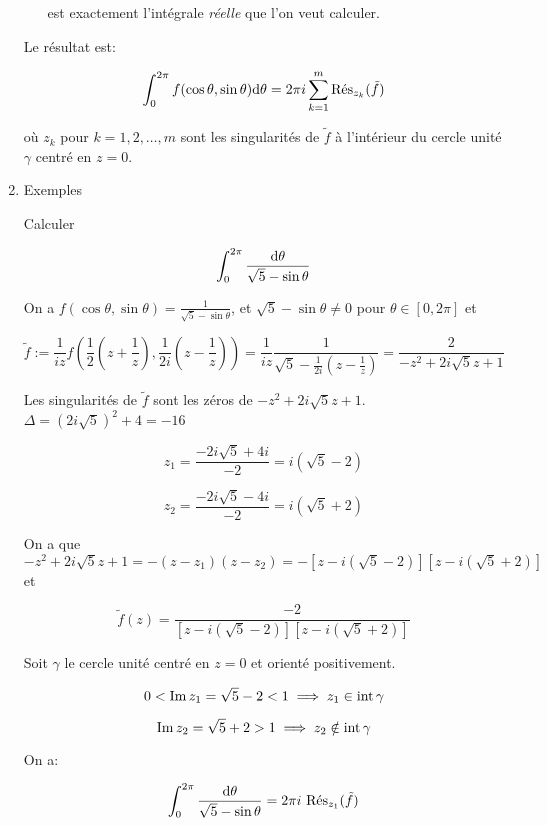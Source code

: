 \begin{enumerate}[label=\alph*)]
\begin{itemize}
    est exactement l'intégrale \textit{réelle} que l'on veut calculer.
    \end{itemize}

    Le résultat est:
    
    \[ \int_0^{2\pi} f(\cos \theta, \sin \theta) \dth = 2\pi i \sum_{k = 1}^m \Res_{z_k}(\tilde{f}) \]
    
    où $z_k$ pour $k = 1, 2, \ldots, m$ sont les singularités de $\tilde{f}$ à l'intérieur du cercle unité $\gamma$ centré en $z = 0$.
    
    \item Exemples
    
    \begin{example}[1]
        Calculer
        
        \[ \int_0^{2\pi} \frac{\dth}{\sqrt{5} - \sin \theta} \]
        
        On a $f(\cos \theta, \sin \theta) = \frac{1}{\sqrt{5} - \sin \theta}$, et $\sqrt{5} - \sin \theta \neq 0$ pour $\theta \in [0, 2\pi]$ et
        
        \[ \tilde{f} := \frac{1}{iz} f\left(\frac{1}{2} \left(z + \frac{1}{z}\right), \frac{1}{2i} \left(z - \frac{1}{z}\right)\right) = \frac{1}{iz} \frac{1}{\sqrt{5} - \frac{1}{2i} \left(z - \frac{1}{z}\right)} = \frac{2}{-z^2 + 2i\sqrt{5}z + 1} \]
        
        Les singularités de $\tilde{f}$ sont les zéros de $-z^2 + 2i\sqrt{5}z + 1$. $\Delta = (2i\sqrt{5})^2 + 4 = -16$
        
        \[ z_1 = \frac{-2i\sqrt{5} + 4i}{-2} = i(\sqrt{5} - 2) \]
        
        \[ z_2 = \frac{-2i\sqrt{5} - 4i}{-2} = i(\sqrt{5} + 2) \]
        
        On a que $-z^2 + 2i\sqrt{5}z + 1 = -(z - z_1)(z - z_2) = - \left[ z - i(\sqrt{5} - 2) \right] \left[ z - i(\sqrt{5} + 2) \right]$ et
        
        \[ \tilde{f}(z) = \frac{-2}{\left[ z - i(\sqrt{5} - 2) \right] \left[ z - i(\sqrt{5} + 2) \right]} \]
        
        Soit $\gamma$ le cercle unité centré en $z = 0$ et orienté positivement.
        
        \[ 0 < \Imp z_1 = \sqrt{5} - 2 < 1 \implies z_1 \in \inte \gamma  \]
        
        \[ \Imp z_2 = \sqrt{5} + 2 > 1 \implies z_2 \notin \inte \gamma \]
        
        On a:
        
        \[ \int_0^{2\pi} \frac{\dth}{\sqrt{5} - \sin \theta} = 2\pi i \ \Res_{z_1} (\tilde{f}) \]
        

\end{example}
\end{enumerate}
